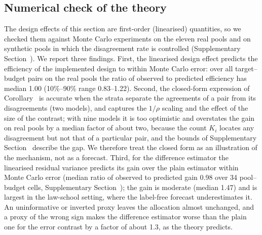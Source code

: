 \subsection{Numerical check of the theory}\label{sec:numcheck}
The design effects of this section are first-order (linearised) quantities, so we checked them against Monte Carlo experiments on the eleven real pools and on synthetic pools in which the disagreement rate is controlled (Supplementary Section~). We report three findings. First, the linearised design effect predicts the efficiency of the implemented design to within Monte Carlo error: over all target--budget pairs on the real pools the ratio of observed to predicted efficiency has median 1.00 (10\%--90\% range 0.83--1.22). Second, the closed-form expression of Corollary~ is accurate when the strata separate the agreements of a pair from its disagreements (two models), and captures the $1/\rho$ scaling and the effect of the size of the contrast; with nine models it is too optimistic and overstates the gain on real pools by a median factor of about two, because the count $K_i$ locates any disagreement but not that of a particular pair, and the bounds of Supplementary Section~ describe the gap. We therefore treat the closed form as an illustration of the mechanism, not as a forecast. Third, for the difference estimator the linearised residual variance predicts its gain over the plain estimator within Monte Carlo error (median ratio of observed to predicted gain 0.98 over 34 pool--budget cells, Supplementary Section~); the gain is moderate (median 1.47) and is largest in the law-school setting, where the label-free forecast underestimates it. An uninformative or inverted proxy leaves the allocation almost unchanged, and a proxy of the wrong sign makes the difference estimator worse than the plain one for the error contrast by a factor of about 1.3, as the theory predicts.
